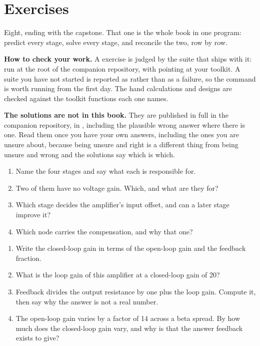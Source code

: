 
\section{Exercises}
\label{c10:sec:exercises}

Eight, ending with the capstone. That one is the whole book in one program: predict every stage, solve every stage, and reconcile the two, row by row.

\begin{aside}
\textbf{How to check your work.} A  exercise is judged by the suite that ships with it: run  at the root of the companion repository, with  pointing at your toolkit. A suite you have not started is reported as  rather than as a failure, so the command is worth running from the first day. The hand calculations and designs are checked against the toolkit functions each one names.

\textbf{The solutions are not in this book.} They are published in full in the companion repository, in , including the plausible wrong answer where there is one. Read them once you have your own answers, including the ones you are unsure about, because being unsure and right is a different thing from being unsure and wrong and the solutions say which is which.
\end{aside}

\label{c10:ex:1}
\begin{enumerate}
  \item Name the four stages and say what each is responsible for.
  \item Two of them have no voltage gain. Which, and what are they for?
  \item Which stage decides the amplifier's input offset, and can a later stage improve it?
  \item Which node carries the compensation, and why that one?
\end{enumerate}

\label{c10:ex:2}
\begin{enumerate}
  \item Write the closed-loop gain in terms of the open-loop gain and the feedback fraction.
  \item What is the loop gain of this amplifier at a closed-loop gain of 20?
  \item Feedback divides the output resistance by one plus the loop gain. Compute it, then say why the answer is not a real number.
  \item The open-loop gain varies by a factor of 14 across a beta spread. By how much does the closed-loop gain vary, and why is that the answer feedback exists to give?
\end{enumerate}

